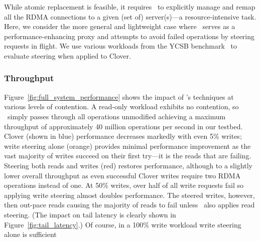 While atomic replacement is feasible, it requires \sword\ to
explicitly manage and remap all the RDMA connections to a given (set
of) server(s)---a resource-intensive task.  Here, we consider the more
general and lightweight case where \sword\ serves as a
performance-enhancing proxy and attempts to avoid failed operations by
steering requests in flight.  We use various workloads from the YCSB
benchmark~\cite{ycsb} to evaluate steering
when applied to Clover.

\subsubsection{Throughput}

Figure~\ref{fig:full_system_performance} shows the impact of \sword's
techniques at various levels of contention.  A read-only workload
exhibits no contention, so \sword\ simply passes through all
operations unmodified achieving a maximum throughput of approximately
40 million operations per second in our testbed.  Clover (shown in
blue) performance decreases markedly with even 5\% writes; write
steering alone (orange) provides minimal performance improvement as
the vast majority of writes succeed on their first try---it is the
reads that are failing.  Steering both reads and writes (red) restores
performance, although to a slightly lower overall throughput as even
successful Clover writes require two RDMA operations instead of one.
%
%
At 50\% writes, over half of all write requests fail so applying write
steering almost doubles performance.  The steered writes, however,
then out-pace reads causing the majority of reads to fail unless
\sword\ also applies read steering.  (The impact on tail latency is
clearly shown in Figure~\ref{fig:tail_latency}.)  Of course, in a
100\% write workload write steering alone is sufficient
%
%



